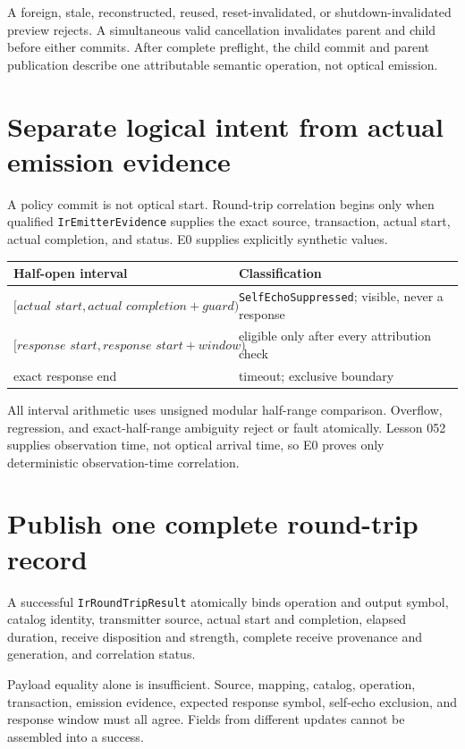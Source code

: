 \documentclass[10pt]{article}
\begin{document}
A foreign, stale, reconstructed, reused, reset-invalidated, or
shutdown-invalidated preview rejects. A simultaneous valid cancellation
invalidates parent and child before either commits. After complete preflight,
the child commit and parent publication describe one attributable semantic
operation, not optical emission.

\section{Separate logical intent from actual emission evidence}
A policy commit is not optical start. Round-trip correlation begins only when
qualified \texttt{IrEmitterEvidence} supplies the exact source, transaction,
actual start, actual completion, and status. E0 supplies explicitly synthetic
values.

\begin{center}
\begin{tabularx}{0.92\linewidth}{@{}l X@{}}
\toprule
Half-open interval & Classification\\
\midrule
\([\textit{actual start},\textit{actual completion}+\textit{guard})\) &
\texttt{SelfEchoSuppressed}; visible, never a response\\
\([\textit{response start},\textit{response start}+\textit{window})\) &
eligible only after every attribution check\\
exact response end & timeout; exclusive boundary\\
\bottomrule
\end{tabularx}
\end{center}

All interval arithmetic uses unsigned modular half-range comparison. Overflow,
regression, and exact-half-range ambiguity reject or fault atomically.
Lesson 052 supplies observation time, not optical arrival time, so E0 proves
only deterministic observation-time correlation.

\newpage
\section{Publish one complete round-trip record}
A successful \texttt{IrRoundTripResult} atomically binds operation and output
symbol, catalog identity, transmitter source, actual start and completion,
elapsed duration, receive disposition and strength, complete receive
provenance and generation, and correlation status.

Payload equality alone is insufficient. Source, mapping, catalog, operation,
transaction, emission evidence, expected response symbol, self-echo exclusion,
and response window must all agree. Fields from different updates cannot be
assembled into a success.
\end{document}
